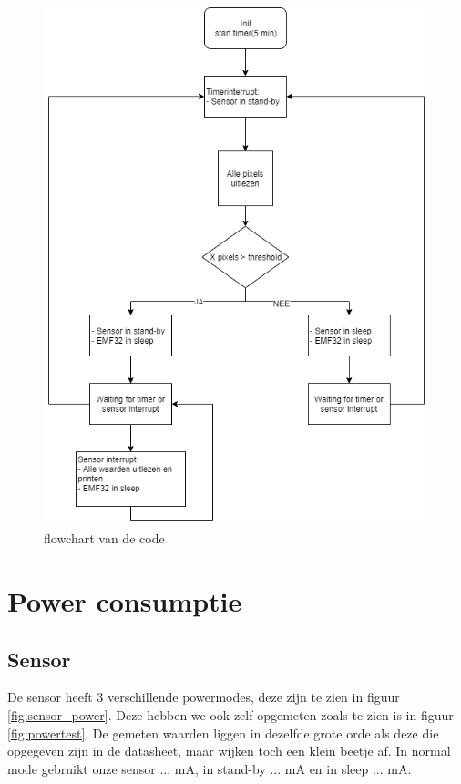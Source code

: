 \documentclass[]{article}
\begin{document}
\begin{figure}[!ht]
	\centering
	\includegraphics[scale=0.5]{flowchart.png}
	\caption{flowchart van de code}
	\label{fig:flowchart}
\end{figure}


\section{Power consumptie}
\subsection{Sensor}
De sensor heeft 3 verschillende powermodes, deze zijn te zien in figuur \ref{fig:sensor_power}. Deze hebben we ook zelf opgemeten zoals te zien is in figuur \ref{fig:powertest}. De gemeten waarden liggen in dezelfde grote orde als deze die opgegeven zijn in de datasheet, maar wijken toch een klein beetje af. In normal mode gebruikt onze sensor ... mA, in stand-by ... mA en in sleep ... mA.
\end{document}
